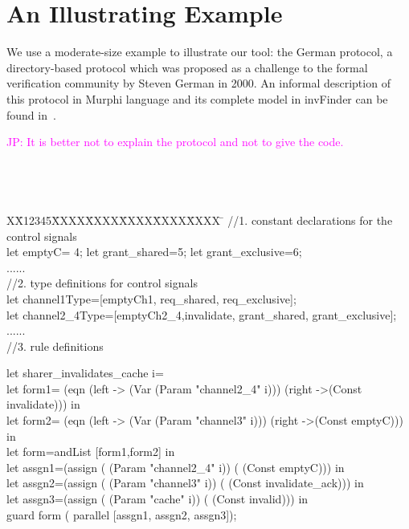 \documentclass{llncs}
\newlength{\fminilength}
\newenvironment{fmini}[1][\linewidth]
  {\setlength{\fminilength}{#1\fboxsep-2\fboxrule}%
   \vspace{2ex}\noindent\begin{lrbox}{\fminibox}\begin{minipage}{\fminilength}%
   \mbox{ }\hfill\vspace{-2.5ex}}%
  {\end{minipage}\end{lrbox}\vspace{1ex}\hspace{0ex}%
   \framebox{\usebox{\fminibox}}}
\newenvironment{specification}
{\noindent\scriptsize \tt\begin{fmini}\begin{tabbing}X\=X12345\=XXXX\=XXXX\=XXXX\=XXXX\=XXXX
\=\+\kill} {\end{tabbing}\normalfont\end{fmini}}
\newcommand\JP[1]{\textcolor{magenta}{JP: #1}}
\begin{document}
\section{An Illustrating Example}
We use a moderate-size example to illustrate our tool: the German protocol, a
directory-based protocol which was proposed as a challenge to the
formal verification community by Steven German in 2000. An informal description of this protocol in
Murphi language and its complete model in {\sf invFinder} can be found in~\cite{}.

\JP{It is better not to explain the protocol and not to give the code.}

\begin{specification}
//1. constant declarations for the control signals\\
 let emptyC= 4; let grant\_shared=5; let grant\_exclusive=6;\\
......\\
//2. type definitions for control signals\\
let channel1Type=[emptyCh1, req\_shared, req\_exclusive];\\

let channel2\_4Type=[emptyCh2\_4,invalidate, grant\_shared,
grant\_exclusive];\\
......\\
//3. rule definitions  \

let sharer\_invalidates\_cache i=\\
    let form1= (eqn (left -> (Var (Param "channel2\_4" i)))  (right ->(Const invalidate))) in\\
    let form2= (eqn (left -> (Var (Param "channel3" i)))  (right ->(Const emptyC))) in\\
    let form=andList [form1,form2] in\\
    let assgn1=(assign (  (Param "channel2\_4" i)) ( (Const emptyC))) in\\
    let assgn2=(assign (  (Param "channel3" i)) ( (Const invalidate\_ack))) in\\
    let assgn3=(assign  (  (Param "cache" i)) ( (Const invalid))) in\\
    guard form ( parallel [assgn1, assgn2, assgn3]);\\


\end{specification}
\end{document}
